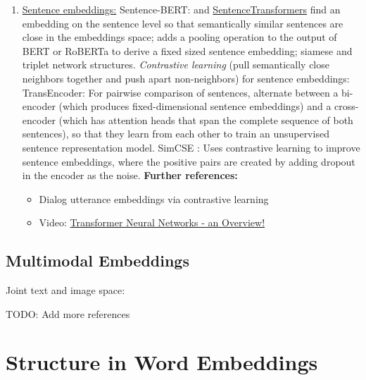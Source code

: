 \documentclass[11pt, a4paper]{amsart}
\begin{document}
\begin{enumerate}[resume]
    \item \underline{Sentence embeddings:}
    \newline
    Sentence-BERT: \cite{DBLP:journals/corr/abs-1908-10084} and \href{https://www.sbert.net/}{SentenceTransformers}
    find an embedding on the sentence level so that semantically similar sentences are close in the embeddings space;
    adds a pooling operation to the output of BERT or RoBERTa to derive a fixed sized sentence embedding;
    siamese and triplet network structures.
    \newline
    \emph{Contrastive learning} (pull semantically close neighbors together and push apart non-neighbors) for sentence embeddings:
    \newline
    TransEncoder: For pairwise comparison of sentences, \cite{DBLP:journals/corr/abs-2109-13059} alternate between a bi-encoder (which produces fixed-dimensional sentence embeddings) and a cross-encoder (which has attention heads that span the complete sequence of both sentences), so that they learn from each other to train an unsupervised sentence representation model.
    \newline
    SimCSE \cite{DBLP:journals/corr/abs-2104-08821}: Uses contrastive learning to improve sentence embeddings, where the positive pairs are created by adding dropout in the encoder as the noise.
    \newline
    \textbf{Further references:}
    \begin{itemize}
        \item Dialog utterance embeddings via contrastive learning \cite{https://doi.org/10.48550/arxiv.2205.13568}
        \item Video: \href{https://youtu.be/O3xbVmpdJwU}{Transformer Neural Networks - an Overview!}
    \end{itemize}
\end{enumerate}

\subsection{Multimodal Embeddings}

Joint text and image space:
\cite{DBLP:journals/corr/abs-2111-07180}

TODO: Add more references

\section{Structure in Word Embeddings}
\end{document}

